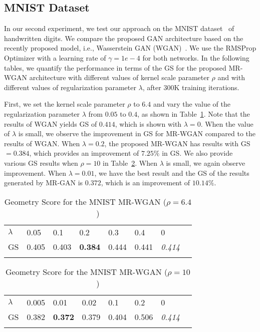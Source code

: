 \documentclass[10pt,twocolumn,letterpaper]{article}
\begin{document}
\subsection{MNIST Dataset}
In our second experiment, we test our approach on the {{MNIST dataset~\cite{mnist_data}}} of handwritten digits. We compare the proposed GAN architecture based on the recently proposed model, i.e., Wasserstein GAN (WGAN)~\cite{arjovsky2017wasserstein}. We use the RMSProp Optimizer with a learning rate of $\gamma=1e-4$ for both networks. In the following tables, we quantify the performance in terms of the GS for the proposed MR-WGAN architecture with different values of kernel scale parameter $\rho$ and with different values of regularization parameter $\lambda$, after 300K training iterations. 

First, we set the kernel scale parameter $\rho$ to $6.4$ and vary the value of the regularization parameter $\lambda$ from $0.05$ to $0.4$, as shown in Table~\ref{rho64}. Note that the results of WGAN yields GS of $0.414$, which is shown with $\lambda=0$. When the value of $\lambda$ is small, we observe the improvement in GS for MR-WGAN compared to the results of WGAN. When $\lambda=0.2$, the proposed MR-WGAN has results with GS $=0.384$, which provides an improvement of $7.25\%$ in GS. We also provide various GS results when $\rho=10$ in Table~\ref{rho10}. When $\lambda$ is small, we again observe improvement. When $\lambda=0.01$, we have the best result and the GS of the results generated by MR-GAN is $0.372$, which is an improvement of $10.14\%$.
\begin{table}[h]
\centering
\caption{Geometry Score for the MNIST MR-WGAN ($\rho=6.4$)}
\begin{tabular}{llllllll}
\hline
$\lambda$ & 0.05 & 0.1 & 0.2 & 0.3 & 0.4  &0\\
GS & 0.405 & 0.403 & {\bf0.384} & 0.444 & 0.441 & {\textit {0.414}}\\\hline
\label{rho64}
\end{tabular}
\end{table}
\vspace{-0.2in}
\begin{table}[h]
\centering
\caption{Geometry Score for the MNIST MR-WGAN ($\rho=10$)}
\begin{tabular}{llllllll}
\hline
$\lambda$ & 0.005 & 0.01 & 0.02 & 0.1 & 0.2 & 0 \\
GS & 0.382 & {\bf 0.372} & {0.379} & 0.404 & 0.506 & {\textit{0.414}}\\\hline
\label{rho10}
\end{tabular}
\end{table}
\end{document}
